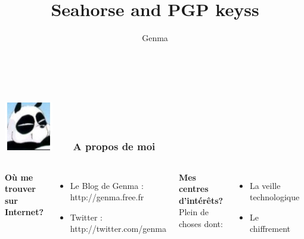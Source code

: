 \documentclass{beamer}
\title[Seahorse and PGP keys]{Seahorse and PGP keyss}
\author{Genma}
\begin{document}
\begin{frame}
	\titlepage
	\vfill
	\begin{center}
		\\[2.5ex]
		{\tiny\CcNote{\CcLongnameByNcSa}}
		\vspace*{-2.5ex}
	\end{center}
\end{frame}





\begin{frame}
\frametitle{\includegraphics[scale=0.4]{./images/Genma.jpg} \ \ \  A propos de moi  }
\begin{columns}[c] 

\textbf{Où me trouver sur Internet?}
\begin{itemize}
\item Le Blog de Genma : http://genma.free.fr
\item Twitter : http://twitter.com/genma
\end{itemize}

\textbf{Mes centres d'intérêts?}
\\ Plein de choses dont:
\begin{itemize}
\item La veille technologique
\item Le chiffrement
\end{itemize}

\includegraphics[width=5cm,height=5cm]{./images/blog.png} 

\end{columns}
\end{frame}
\end{document}
